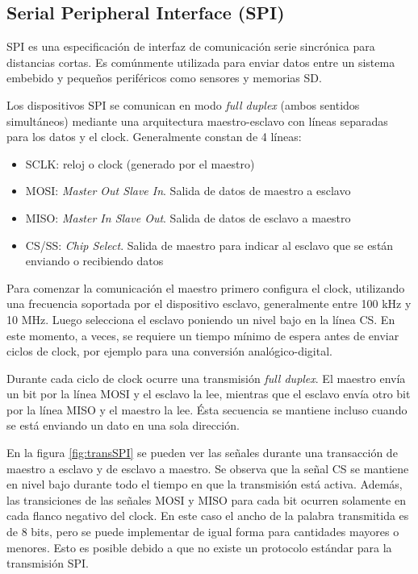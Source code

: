 \subsection{Serial Peripheral Interface (SPI)}

SPI es una especificación de interfaz de comunicación serie sincrónica para distancias cortas. Es comúnmente utilizada para enviar datos entre un sistema embebido y pequeños periféricos como sensores y memorias SD.

Los dispositivos SPI se comunican en modo \textit{full duplex} (ambos sentidos simultáneos) mediante una arquitectura maestro-esclavo con líneas separadas para los datos y el clock. Generalmente constan de 4 líneas:

\begin{itemize}
\item SCLK: reloj o clock (generado por el maestro)
\item MOSI: \textit{Master Out Slave In}. Salida de datos de maestro a esclavo
\item MISO: \textit{Master In Slave Out}. Salida de datos de esclavo a maestro
\item CS/SS: \textit{Chip Select}. Salida de maestro para indicar al esclavo que se están enviando o recibiendo datos
\end{itemize}

Para comenzar la comunicación el maestro primero configura el clock, utilizando una frecuencia soportada por el dispositivo esclavo, generalmente entre 100 kHz y 10 MHz. Luego selecciona el esclavo poniendo un nivel bajo en la línea CS. En este momento, a veces, se requiere un tiempo mínimo de espera antes de enviar ciclos de clock, por ejemplo para una conversión analógico-digital.

Durante cada ciclo de clock ocurre una transmisión \textit{full duplex}. El maestro envía un bit por la línea MOSI y el esclavo la lee, mientras que el esclavo envía otro bit por la línea MISO y el maestro la lee. Ésta secuencia se mantiene incluso cuando se está enviando un dato en una sola dirección.

En la figura \ref{fig:transSPI} se pueden ver las señales durante una transacción de maestro a esclavo y de esclavo a maestro. Se observa que la señal CS se mantiene en nivel bajo durante todo el tiempo en que la transmisión está activa. Además, las transiciones de las señales MOSI y MISO para cada bit ocurren solamente en cada flanco negativo del clock. En este caso el ancho de la palabra transmitida es de 8 bits, pero se puede implementar de igual forma para cantidades mayores o menores. Esto es posible debido a que no existe un protocolo estándar para la transmisión SPI.

